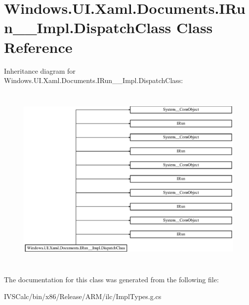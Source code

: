 \hypertarget{class_windows_1_1_u_i_1_1_xaml_1_1_documents_1_1_i_run_____impl_1_1_dispatch_class}{}\section{Windows.\+U\+I.\+Xaml.\+Documents.\+I\+Run\+\_\+\+\_\+\+Impl.\+Dispatch\+Class Class Reference}
\label{class_windows_1_1_u_i_1_1_xaml_1_1_documents_1_1_i_run_____impl_1_1_dispatch_class}
Inheritance diagram for Windows.\+U\+I.\+Xaml.\+Documents.\+I\+Run\+\_\+\+\_\+\+Impl.\+Dispatch\+Class\+:\begin{figure}[H]
\begin{center}
\leavevmode
\includegraphics[height=9.277108cm]{class_windows_1_1_u_i_1_1_xaml_1_1_documents_1_1_i_run_____impl_1_1_dispatch_class}
\end{center}
\end{figure}


The documentation for this class was generated from the following file\+:\begin{DoxyCompactItemize}
\item 
I\+V\+S\+Calc/bin/x86/\+Release/\+A\+R\+M/ilc/Impl\+Types.\+g.\+cs\end{DoxyCompactItemize}
